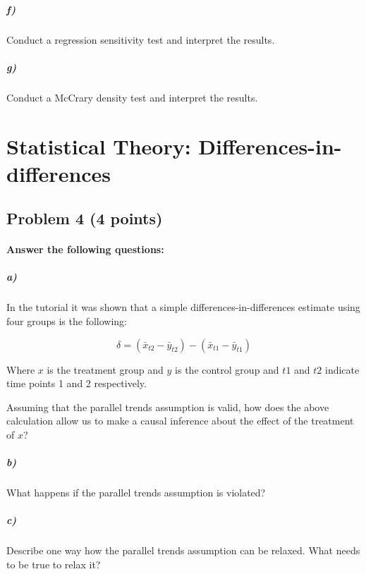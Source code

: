 \documentclass[12pt]{article}
\begin{document}
\subparagraph{f)} Conduct a regression sensitivity test and interpret the results.

\subparagraph{g)} Conduct a McCrary density test and interpret the results.




\section*{Statistical Theory: Differences-in-differences}

\subsection*{Problem 4 (4 points)}

\paragraph{Answer the following questions:}

\subparagraph*{a)} In the tutorial it was shown that a simple differences-in-differences estimate using four groups is the following:

$$ \delta = (\bar{x} _{t2} - \bar{y} _{t2}) - (\bar{x} _{t1} - \bar{y} _{t1}) $$

Where $x$ is the treatment group and $y$ is the control group and $t1$ and $t2$ indicate time points 1 and 2 respectively.

Assuming that the parallel trends assumption is valid, how does the above calculation allow us to make a causal inference about the effect of the treatment of $x$?

\subparagraph*{b)} What happens if the parallel trends assumption is violated?

\subparagraph*{c)} Describe one way how the parallel trends assumption can be relaxed. What needs to be true to relax it?
\end{document}
